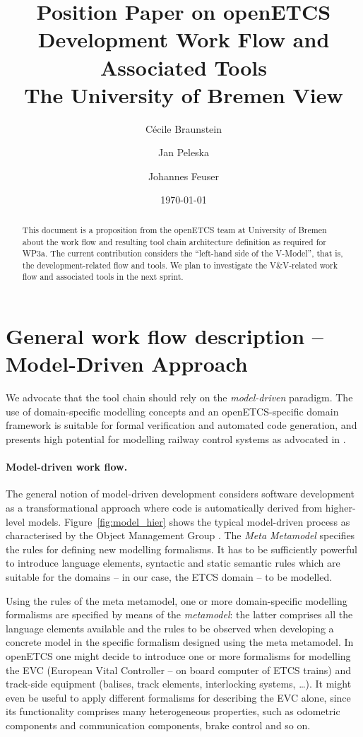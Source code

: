 \documentclass[11pt, a4paper]{article}
\title{Position Paper on  openETCS Development Work Flow and Associated Tools \\ The University of Bremen View}
\author{C\'ecile Braunstein \and Jan Peleska \and Johannes Feuser}
\date{\today}
\begin{document}
\maketitle
\begin{abstract}
This document is a proposition from the openETCS team at University of Bremen about the 
work flow and resulting tool chain 
architecture definition as required for WP3a. The current contribution considers the ``left-hand side of the V-Model'', that is, the development-related flow and tools. We plan to investigate the V\&V-related
work flow and associated tools in the next sprint.
\end{abstract}


\section{General work flow description -- Model-Driven Approach}
We advocate that  the tool chain should rely on the {\it model-driven} paradigm.
The use of domain-specific modelling concepts and an openETCS-specific domain framework is suitable for
formal verification and automated code generation, and presents high potential
for modelling railway control systems as advocated in 
\cite{RSRSChapter2012,DBLP:journals/fac/HaxthausenPK11,SecurityInOMS}.


\paragraph{Model-driven work flow.}
The general notion of model-driven development considers software development as
a transformational approach where code is automatically derived from higher-level models.  
Figure~\ref{fig:model_hier} shows the typical model-driven process as characterised by the
Object Management Group \cite{OMGUML}. 
The \emph{Meta Metamodel} specifies the rules for defining new modelling formalisms.
It has to be sufficiently powerful to introduce language elements, syntactic and static semantic 
rules which are suitable for the domains -- in our case, the ETCS domain -- to be modelled. 

Using the rules of the meta metamodel, one or more domain-specific modelling formalisms are
specified by means of the \emph{metamodel}: the latter comprises all the language elements available and the rules to be observed when developing a concrete model in the specific formalism designed using the meta metamodel. In openETCS one might decide to introduce one or more formalisms for modelling the
EVC (European Vital Controller -- on board computer of ETCS trains) and track-side equipment (balises, track elements, interlocking systems, \ldots). It might even be useful to apply different formalisms for describing the EVC alone, since its functionality comprises many heterogeneous properties, such as odometric components and communication components, brake control and so on.
\end{document}
